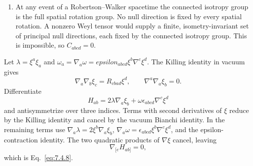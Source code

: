 \begin{enumerate}[leftmargin=2.8em,itemsep=1.2em]
\begin{enumerate}[label=\alph*),leftmargin=2em]
\item At any event of a Robertson--Walker spacetime the connected isotropy
group is the full spatial rotation group.  No null direction is fixed by
every spatial rotation.  A nonzero Weyl tensor would supply a finite,
isometry-invariant set of principal null directions, each fixed by the
connected isotropy group.  This is impossible, so \(C_{abcd}=0\).
\end{enumerate}

Let
\(\lambda=\xi^a\xi_a\) and
\(\omega_a=\nabla_a\omega=epsilon_{abcd}\xi^b\nabla^c\xi^d\).
The Killing identity in vacuum gives
\[
 \nabla_a\nabla_b\xi_c=R_{cbad}\xi^d,
 \qquad \nabla^a\nabla_a\xi_b=0.
\]
Differentiate
\[
 H_{ab}=2\lambda\nabla_a\xi_b
 +\omega\epsilon_{abcd}\nabla^c\xi^d
\]
and antisymmetrize over three indices.  Terms with second derivatives of
\(\xi\) reduce by the Killing identity and cancel by the vacuum Bianchi
identity.  In the remaining terms use
\(\nabla_a\lambda=2\xi^b\nabla_a\xi_b\),
\(\nabla_a\omega=\epsilon_{abcd}\xi^b\nabla^c\xi^d\), and the
epsilon-contraction identity.  The two quadratic products of
\(\nabla\xi\) cancel, leaving
\[
 \nabla_{[e}H_{ab]}=0,
\]
which is Eq.~\eqref{eq:7.4.8}.
\end{enumerate}
